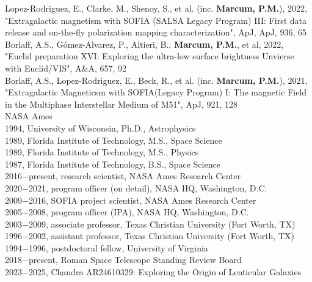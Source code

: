 {{\PubSym}Lopez-Rodriguez, E., Clarke, M., Shenoy, S., et al. (inc. \textbf{Marcum, P.M.}), 2022, "Extragalactic magnetism with SOFIA (SALSA Legacy Program) III: First data release and on-the-fly polarization mapping characterization", ApJ, ApJ, 936, 65\\ 
{\PubSym}Borlaff, A.S., G{\'o}mez-Alvarez, P., Altieri, B., \textbf{Marcum, P.M.}, et al, 2022, "Euclid preparation XVI: Exploring the ultra-low surface brightness Unvierse with Euclid/VIS", A\&A, 657, 92\\ 
{\PubSym}Borlaff, A.S., Lopez-Rodriguez, E., Beck, R., et al. (inc. \textbf{Marcum, P.M.}), 2021, "Extragalactic Magneticsm with SOFIA(Legacy Program) I: The magnetic Field in the Multiphase Interstellar Medium of M51", ApJ, 921, 128\newpage%
\NameFontstyle{\color{\NameColor}{\NameSize Dr. Pamela M. Marcum (Administrative PI):}}\\
NASA Ames
\SectionSpacing
{}\\
1994, University of Wisconsin, Ph.D., Astrophysics\\ 
1989, Florida Institute of Technology, M.S., Space Science\\ 
1989, Florida Institute of Technology, M.S., Physics\\ 
1987, Florida Institute of Technology, B.S., Space Science
\SectionSpacing
{}\\
2016$-$present, research scientist, NASA Ames Research Center\\ 
2020$-$2021, program officer (on detail), NASA HQ, Washington, D.C.\\ 
2009$-$2016, SOFIA project scientist, NASA Ames Research Center\\ 
2005$-$2008, program officer (IPA), NASA HQ, Washington, D.C.\\ 
2003$-$2009, associate professor, Texas Christian University (Fort Worth, TX)\\ 
1996$-$2002, assistant professor, Texas Christian University (Fort Worth, TX)\\ 
1994$-$1996, postdoctoral fellow, University of Virginia
\SectionSpacing
{}\\
2018$-$present, Roman Space Telescope Standing Review Board\\ 
2023$-$2025, Chandra AR24610329: Exploring the Origin of Lenticular Galaxies
}
